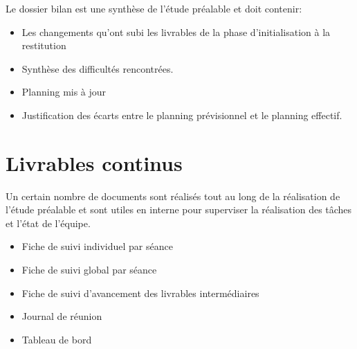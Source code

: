 		Le dossier bilan est une synthèse de l'étude préalable et doit contenir:

		\begin{itemize}
		    \item Les changements qu'ont subi les livrables de la phase d'initialisation à la restitution
		    \item Synthèse des difficultés rencontrées.
		    \item Planning mis à jour
		    \item Justification des écarts entre le planning prévisionnel et le planning effectif.
		\end{itemize}



	\section{Livrables continus}

	Un certain nombre de documents sont réalisés tout au long de la réalisation de l'étude préalable et sont utiles en interne pour superviser la réalisation des tâches et l'état de l'équipe.

	\begin{itemize}
	    \item Fiche de suivi individuel par séance
	    \item Fiche de suivi global par séance
	    \item Fiche de suivi d’avancement des livrables intermédiaires
	    \item Journal de réunion
	    \item Tableau de bord
	\end{itemize}